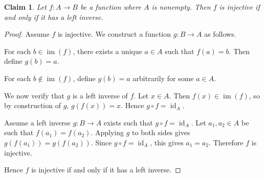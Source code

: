 \documentclass{article}
\newtheorem*{claim}{Claim}
\begin{document}
\begin{claim}
    Let $f : A \to B$ be a function where $A$ is nonempty. Then $f$ is injective 
    if and only if it has a left inverse.
\end{claim}

\begin{proof}
    Assume $f$ is injective. We construct a function $g : B \to A$ as follows.
    
    \medskip

    For each $b \in \operatorname{im}(f)$, there exists a unique $a \in A$ such that 
    $f(a) = b$. Then define $g(b) = a$.

    \medskip

    For each $b \notin \operatorname{im}(f)$, define $g(b) = a$ arbitrarily for some $a 
    \in A$.

    \medskip

    We now verify that $g$ is a left inverse of $f$. Let $x \in A$. Then $f(x) \in 
    \operatorname{im}(f)$, so by construction of $g$, $g(f(x)) = x$. Hence $g \circ f = 
    \operatorname{id}_A$.

    \medskip

    Assume a left inverse $g : B \to A$ exists such that $g \circ f = \operatorname{id}_A$. 
    Let $a_1, a_2 \in A$ be such that $f(a_1) = f(a_2)$. Applying $g$ to both sides 
    gives $g(f(a_1)) = g(f(a_2))$. Since $g \circ f = \operatorname{id}_A$, this gives $a_1 
    = a_2$. Therefore $f$ is injective.

    \medskip

    Hence $f$ is injective if and only if it has a left inverse.
\end{proof}
\end{document}
